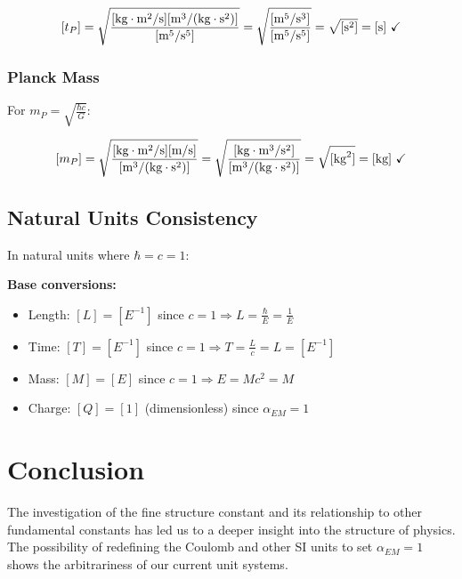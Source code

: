 \documentclass[12pt,a4paper]{article}
\begin{document}
	$$[t_P] = \sqrt{\frac{[\text{kg}\cdot\text{m}^2/\text{s}][\text{m}^3/(\text{kg}\cdot\text{s}^2)]}{[\text{m}^5/\text{s}^5]}} = \sqrt{\frac{[\text{m}^5/\text{s}^3]}{[\text{m}^5/\text{s}^5]}} = \sqrt{[\text{s}^2]} = [\text{s}] \text{ \checkmark}$$
	
	\subsubsection{Planck Mass}
	For $m_P = \sqrt{\frac{\hbar c}{G}}$:
	
	$$[m_P] = \sqrt{\frac{[\text{kg}\cdot\text{m}^2/\text{s}][\text{m/s}]}{[\text{m}^3/(\text{kg}\cdot\text{s}^2)]}} = \sqrt{\frac{[\text{kg}\cdot\text{m}^3/\text{s}^2]}{[\text{m}^3/(\text{kg}\cdot\text{s}^2)]}} = \sqrt{[\text{kg}^2]} = [\text{kg}] \text{ \checkmark}$$
	
	\subsection{Natural Units Consistency}
	
	In natural units where $\hbar = c = 1$:
	
	\begin{tcolorbox}[colback=green!5!white,colframe=green!75!black,title=Natural Units Dimensional Consistency]
		\textbf{Base conversions:}
		\begin{itemize}
			\item Length: $[L] = [E^{-1}]$ since $c = 1 \Rightarrow L = \frac{\hbar}{E} = \frac{1}{E}$
			\item Time: $[T] = [E^{-1}]$ since $c = 1 \Rightarrow T = \frac{L}{c} = L = [E^{-1}]$
			\item Mass: $[M] = [E]$ since $c = 1 \Rightarrow E = Mc^2 = M$
			\item Charge: $[Q] = [1]$ (dimensionless) since $\alpha_{EM} = 1$
		\end{itemize}
	\end{tcolorbox}
	
	\section{Conclusion}
	
	The investigation of the fine structure constant and its relationship to other fundamental constants has led us to a deeper insight into the structure of physics. The possibility of redefining the Coulomb and other SI units to set $\alpha_{EM} = 1$ shows the arbitrariness of our current unit systems.
	
\end{document}
